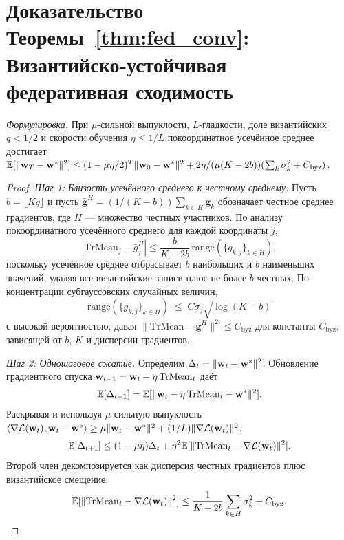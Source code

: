 \section{Доказательство Теоремы~\ref{thm:fed_conv}: Византийско-устойчивая федеративная сходимость}
\label{app:proof_fed}

\noindent\textit{Формулировка.} При $\mu$-сильной выпуклости, $L$-гладкости, доле византийских $q<1/2$ и скорости обучения $\eta\le 1/L$ покоординатное усечённое среднее достигает $\mathbb{E}[\|\mathbf{w}_T-\mathbf{w}^*\|^2]\le(1-\mu\eta/2)^T\|\mathbf{w}_0-\mathbf{w}^*\|^2 + 2\eta/(\mu(K-2b))(\sum_k\sigma_k^2 + C_{\mathrm{byz}})$.

\begin{proof}
\textit{Шаг 1: Близость усечённого среднего к честному среднему.} Пусть $b=\lfloor Kq\rfloor$ и пусть $\bar{\mathbf{g}}^H = (1/(K-b))\sum_{k\in H}\mathbf{g}_k$ обозначает честное среднее градиентов, где $H$ --- множество честных участников. По анализу покоординатного усечённого среднего для каждой координаты $j$,
\begin{equation}
|\mathrm{TrMean}_j - \bar{g}_j^H|
\le \frac{b}{K-2b}\,\mathrm{range}(\{g_{k,j}\}_{k\in H}),
\end{equation}
поскольку усечённое среднее отбрасывает $b$ наибольших и $b$
наименьших значений, удаляя все византийские записи плюс не более
$b$ честных. По концентрации субгауссовских случайных величин,
\begin{equation*}
\mathrm{range}(\{g_{k,j}\}_{k\in H})
\;\le\; C\sigma_j\sqrt{\log(K-b)}
\end{equation*}
с высокой вероятностью, давая
$\|\mathrm{TrMean}-\bar{\mathbf{g}}^H\|^2\le C_{\mathrm{byz}}$
для константы $C_{\mathrm{byz}}$, зависящей от $b$, $K$ и дисперсии
градиентов.

\textit{Шаг 2: Одношаговое сжатие.} Определим $\Delta_t = \|\mathbf{w}_t-\mathbf{w}^*\|^2$. Обновление градиентного спуска $\mathbf{w}_{t+1}=\mathbf{w}_t-\eta\,\mathrm{TrMean}_t$ даёт
\begin{equation}
\mathbb{E}[\Delta_{t+1}]
= \mathbb{E}[\|\mathbf{w}_t - \eta\,\mathrm{TrMean}_t - \mathbf{w}^*\|^2].
\end{equation}
Раскрывая и используя $\mu$-сильную выпуклость $\langle\nabla\mathcal{L}(\mathbf{w}_t),\mathbf{w}_t-\mathbf{w}^*\rangle\ge\mu\|\mathbf{w}_t-\mathbf{w}^*\|^2 + (1/L)\|\nabla\mathcal{L}(\mathbf{w}_t)\|^2$,
\begin{equation}
\mathbb{E}[\Delta_{t+1}]
\le (1-\mu\eta)\Delta_t + \eta^2\mathbb{E}[\|\mathrm{TrMean}_t - \nabla\mathcal{L}(\mathbf{w}_t)\|^2].
\end{equation}
Второй член декомпозируется как дисперсия честных градиентов плюс византийское смещение:
\begin{equation}
\mathbb{E}[\|\mathrm{TrMean}_t - \nabla\mathcal{L}(\mathbf{w}_t)\|^2]
\le \frac{1}{K-2b}\sum_{k\in H}\sigma_k^2 + C_{\mathrm{byz}}.
\end{equation}


\end{proof}
